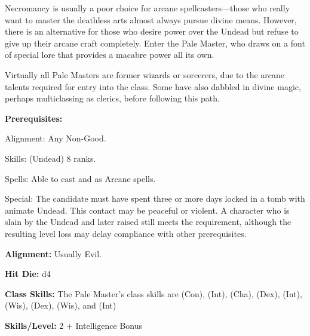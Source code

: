 
Necromancy is usually a poor choice for arcane spellcasters—those who really want to master the deathless arts almost always pursue divine means. However, there is an alternative for those who desire power over the Undead but refuse to give up their arcane craft completely. Enter the Pale Master, who draws on a font of special lore that provides a macabre power all its own. 
 
Virtually all Pale Masters are former wizards or sorcerers, due to the arcane talents required for entry into the class. Some have also dabbled in divine magic, perhaps multiclassing as clerics, before following this path.

\textbf{Prerequisites:} 
\begin{description*}
\item[\hspace*{1.5cm}Alignment:] Any Non-Good.
\item[\hspace*{1.5cm}Skills:]  (Undead) 8 ranks.
\item[\hspace*{1.5cm}Spells:] Able to cast  and  as Arcane spells.
\item[\hspace*{1.5cm}Special:] The candidate must have spent three or more days locked in a tomb with animate Undead. This contact may be peaceful or violent. A character who is slain by the Undead and later raised still meets the requirement, although the resulting level loss may delay compliance with other prerequisites.
\end{description*}

\textbf{Alignment:} Usually Evil.

\textbf{Hit Die:} d4

\textbf{Class Skills:} The Pale Master's class skills are  (Con),  (Int),  (Cha),  (Dex),  (Int),  (Wis),  (Dex),  (Wis), and  (Int)

\textbf{Skills/Level:} 2 + Intelligence Bonus

\poorbab{}
\poorfor{}
\poorref{}
\goodwil{}

